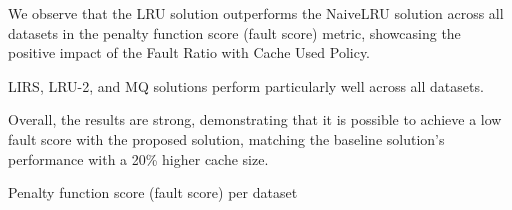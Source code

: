 We observe that the LRU solution outperforms the NaiveLRU solution across all datasets in the 
penalty function score (fault score) metric, showcasing the positive impact of the Fault Ratio 
with Cache Used Policy.

LIRS, LRU-2, and MQ solutions perform particularly well across all datasets.

Overall, the results are strong, demonstrating that it is possible to achieve a low fault 
score with the proposed solution, matching the baseline solution's performance with a 20\% 
higher cache size.

\begin{table}[H]
  \centering
  \small
  \caption{Penalty function score (fault score) per dataset}
  \label{tab:fault-score-per-experiment-dataset}
\end{table}